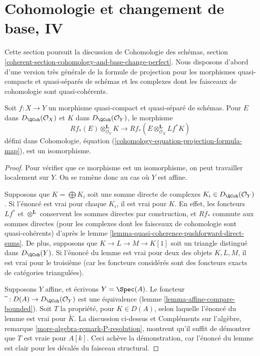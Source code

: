 \section{Cohomologie et changement de base, IV}
\label{section-cohomology-and-base-change-perfect}

\noindent
Cette section poursuit la discussion de
Cohomologie des schémas, section
\ref{coherent-section-cohomology-and-base-change-perfect}.
Nous disposons d'abord d'une version très générale de la formule
de projection pour les morphismes quasi-compacts et quasi-séparés de schémas
et les complexes dont les faisceaux de cohomologie sont quasi-cohérents.

\begin{lemma}
\label{lemma-cohomology-base-change}
Soit $f : X \to Y$ un morphisme quasi-compact et quasi-séparé
de schémas. Pour $E$ dans $D_\QCoh(\mathcal{O}_X)$ et
$K$ dans $D_\QCoh(\mathcal{O}_Y)$, le morphisme
$$
Rf_*(E) \otimes_{\mathcal{O}_Y}^\mathbf{L} K
\longrightarrow
Rf_*(E \otimes_{\mathcal{O}_X}^\mathbf{L} Lf^*K)
$$
défini dans
Cohomologie, équation (\ref{cohomology-equation-projection-formula-map}),
est un isomorphisme.
\end{lemma}

\begin{proof}
Pour vérifier que ce morphisme est un isomorphisme, on peut travailler localement sur $Y$.
On se ramène donc au cas où $Y$ est affine.

\medskip\noindent
Supposons que $K = \bigoplus K_i$ soit une somme
directe de complexes $K_i \in D_\QCoh(\mathcal{O}_Y)$.
Si l'énoncé est vrai pour chaque $K_i$, il est vrai pour $K$.
En effet, les foncteurs $Lf^*$ et $\otimes^\mathbf{L}$ conservent
les sommes directes par construction, et $Rf_*$ commute aux sommes directes
(pour les complexes dont les faisceaux de cohomologie sont quasi-cohérents) d'après le
lemme \ref{lemma-quasi-coherence-pushforward-direct-sums}.
De plus, supposons que $K \to L \to M \to K[1]$ soit un triangle
distingué dans $D_\QCoh(Y)$. Si l'énoncé du
lemme est vrai pour deux des objets $K, L, M$, il est vrai pour le troisième
(car les foncteurs considérés sont des foncteurs exacts de catégories triangulées).

\medskip\noindent
Supposons $Y$ affine, et écrivons $Y = \Spec(A)$. Le foncteur
$\widetilde{\ } : D(A) \to D_\QCoh(\mathcal{O}_Y)$ est une équivalence
(lemme \ref{lemma-affine-compare-bounded}).
Soit $T$ la propriété, pour $K \in D(A)$, selon laquelle
l'énoncé du lemme est vrai pour $\widetilde{K}$.
La discussion ci-dessus et
Compléments sur l'algèbre, remarque \ref{more-algebra-remark-P-resolution},
montrent qu'il suffit de démontrer que $T$ est vraie pour $A[k]$.
Ceci achève la démonstration, car l'énoncé du lemme
est clair pour les décalés du faisceau structural.
\end{proof}

